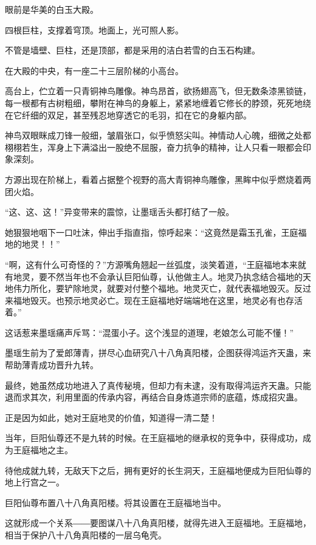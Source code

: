 
\begin{this_body}

眼前是华美的白玉大殿。

四根巨柱，支撑着穹顶。地面上，光可照人影。

不管是墙壁、巨柱，还是顶部，都是采用的洁白若雪的白玉石构建。

在大殿的中央，有一座二十三层阶梯的小高台。

高台上，伫立着一只青铜神鸟雕像。神鸟昂首，欲扬翅高飞，但无数条漆黑锁链，每一根都有古树粗细，攀附在神鸟的身躯上，紧紧地缠着它修长的脖颈，死死地绕在它纤细的双足，甚至残忍地穿透它的毛羽，扣在它的身躯内部。

神鸟双眼眯成刀锋一般细，皱眉张口，似乎愤怒尖叫。神情动人心魄，细微之处都栩栩若生，浑身上下满溢出一股绝不屈服，奋力抗争的精神，让人只看一眼都会印象深刻。

方源出现在阶梯上，看着占据整个视野的高大青铜神鸟雕像，黑眸中似乎燃烧着两团火焰。

“这、这、这！”异变带来的震惊，让墨瑶舌头都打结了一般。

她狠狠地咽下一口吐沫，伸出手指直指，惊呼起来：“这竟然是霜玉孔雀，王庭福地的地灵！！”

“啊，这有什么可奇怪的？”方源嘴角翘起一丝弧度，淡笑着道，“王庭福地本来就有地灵，要不然当年也不会承认巨阳仙尊，认他做主人。地灵乃执念结合福地的天地伟力所化，要铲除地灵，就要对付整个福地。地灵灭亡，就代表福地毁灭。反过来福地毁灭。也预示地灵必亡。现在王庭福地好端端地在这里，地灵必有也存活着。”

这话惹来墨瑶痛声斥骂：“混蛋小子。这个浅显的道理，老娘怎么可能不懂！”

墨瑶生前为了爱郎薄青，拼尽心血研究八十八角真阳楼，企图获得鸿运齐天蛊，来帮助薄青成功晋升九转。

最终，她虽然成功地进入了真传秘境，但却力有未逮，没有取得鸿运齐天蛊。只能退而求其次，利用里面的传承内容，再结合自身炼道宗师的底蕴，炼成招灾蛊。

正是因为如此，她对王庭地灵的价值，知道得一清二楚！

当年，巨阳仙尊还不是九转的时候。在王庭福地的继承权的竞争中，获得成功，成为王庭福地之主。

待他成就九转，无敌天下之后，拥有更好的长生洞天，王庭福地便成为巨阳仙尊的地上行宫之一。

巨阳仙尊布置八十八角真阳楼。将其设置在王庭福地当中。

这就形成一个关系――要图谋八十八角真阳楼，就得先进入王庭福地。王庭福地，相当于保护八十八角真阳楼的一层乌龟壳。


\end{this_body}
